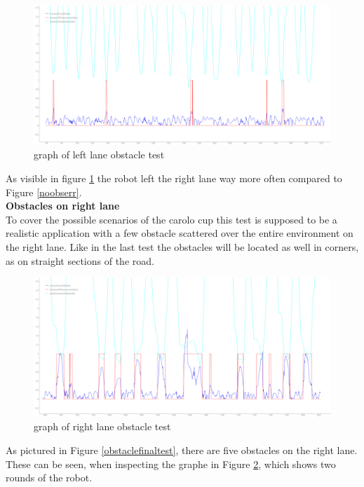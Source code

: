 \begin{figure}[H]
	\includegraphics[width=\textwidth]{Pictures/left obs final obs2}
	\caption{graph of left lane obstacle test}
	\label{leftobsfinal}
\end{figure}
As visible in figure \ref{leftobsfinal} the robot left the right lane way more often compared to Figure \ref{noobserr}.\\

\textbf{Obstacles on right lane}\\

To cover the possible scenarios of the carolo cup this test is supposed to be a realistic application with a few obstacle scattered over the entire environment on the right lane. Like in the last test the obstacles will be located as well in corners, as on straight sections of the road.

\begin{figure}[H]
	\includegraphics[width=\textwidth]{Pictures/right obs final obs}
	\caption{graph of right lane obstacle test}
	\label{rightobsfinal}
\end{figure}


As pictured in Figure \ref{obstaclefinaltest}, there are five obstacles on the right lane. These can be seen, when inspecting the graphe in Figure \ref{rightobsfinal}, which shows two rounds of the robot.


